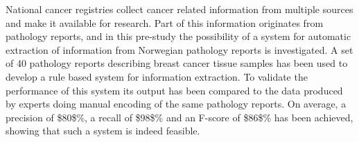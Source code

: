 National cancer registries collect cancer related information from multiple sources and make it available for research. Part of this information originates from pathology reports, and in this pre-study the possibility of a system for automatic extraction of information from Norwegian pathology reports is investigated. A set of 40 pathology reports describing breast cancer tissue samples has been used to develop a rule based system for information extraction. To validate the performance of this system its output has been compared to the data produced by experts doing manual encoding of the same pathology reports. On average, a precision of \$80\$\%, a recall of \$98\$\% and an F-score of \$86\$\% has been achieved, showing that such a system is indeed feasible.
